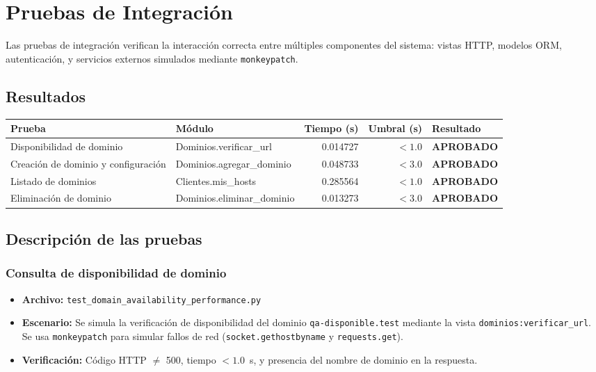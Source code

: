 \documentclass[12pt,a4paper]{article}
\newcommand{\aprobado}{\textcolor{aprobado}{\textbf{APROBADO}}}
\begin{document}
\section{Pruebas de Integración}

Las pruebas de integración verifican la interacción correcta entre múltiples componentes
del sistema: vistas HTTP, modelos ORM, autenticación, y servicios externos simulados
mediante \texttt{monkeypatch}.

\subsection{Resultados}

\begin{center}
\begin{tabularx}{\textwidth}{>{\raggedright}p{3.5cm} >{\raggedright}p{3.2cm} r r >{\centering\arraybackslash}p{2.2cm}}
\toprule
\textbf{Prueba} & \textbf{Módulo} & \textbf{Tiempo (s)} & \textbf{Umbral (s)} & \textbf{Resultado} \\
\midrule
Disponibilidad de dominio
  & Dominios.verificar\_url
  & 0.014727
  & $< 1.0$
  & \aprobado \\
Creación de dominio y configuración
  & Dominios.agregar\_dominio
  & 0.048733
  & $< 3.0$
  & \aprobado \\
Listado de dominios
  & Clientes.mis\_hosts
  & 0.285564
  & $< 1.0$
  & \aprobado \\
Eliminación de dominio
  & Dominios.eliminar\_dominio
  & 0.013273
  & $< 3.0$
  & \aprobado \\
\bottomrule
\end{tabularx}
\end{center}

\subsection{Descripción de las pruebas}

\subsubsection{Consulta de disponibilidad de dominio}

\begin{itemize}
  \item \textbf{Archivo:} \texttt{test\_domain\_availability\_performance.py}
  \item \textbf{Escenario:} Se simula la verificación de disponibilidad del dominio
        \texttt{qa-disponible.test} mediante la vista \texttt{dominios:verificar\_url}.
        Se usa \texttt{monkeypatch} para simular fallos de red (\texttt{socket.gethostbyname}
        y \texttt{requests.get}).
  \item \textbf{Verificación:} Código HTTP $\neq$ 500, tiempo $< 1.0$~s, y presencia del
        nombre de dominio en la respuesta.
\end{itemize}
\end{document}
